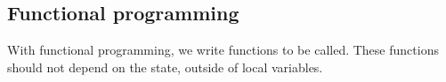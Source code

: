 
\subsection{Functional programming}

With functional programming, we write functions to be called. These functions should not depend on the state, outside of local variables.

